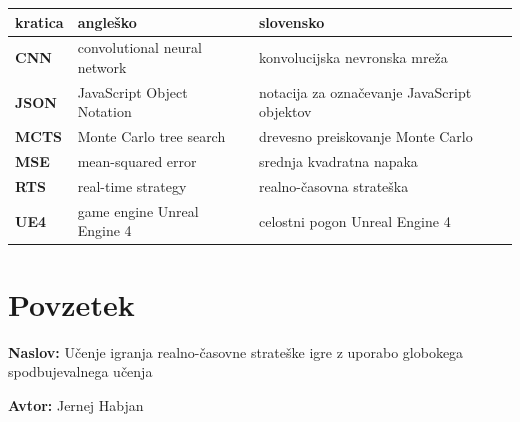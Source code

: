 \documentclass[a4paper, 12pt]{book}
\newcommand{\ttitle}{Učenje igranja realno-časovne strateške igre z uporabo globokega spodbujevalnega učenja}
\newcommand{\tauthor}{Jernej Habjan}
\newcommand{\clearemptydoublepage}{\newpage{\pagestyle{empty}\cleardoublepage}}
\begin{document}

\noindent\begin{tabular}{p{}|p{}|p{}}    %
	{\bf kratica} & {\bf angleško} & {\bf slovensko} \\ \hline
	{\bf CNN}  & convolutional neural network & konvolucijska nevronska mreža \\
	{\bf JSON} & JavaScript Object Notation & notacija za označevanje JavaScript objektov \\
	{\bf MCTS} & Monte Carlo tree search & drevesno preiskovanje Monte Carlo \\
	{\bf MSE}  & mean-squared error & srednja kvadratna napaka \\
	{\bf RTS}  & real-time strategy & realno-časovna strateška\\
	{\bf UE4}  & game engine Unreal Engine 4 & celostni pogon Unreal Engine 4 \\
\end{tabular}


\clearemptydoublepage

\chapter*{Povzetek}

\noindent\textbf{Naslov:} \ttitle
\bigskip

\noindent\textbf{Avtor:} \tauthor
\bigskip
\end{document}
